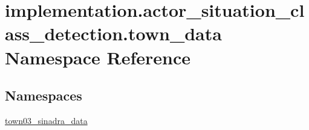 \hypertarget{namespaceimplementation_1_1actor__situation__class__detection_1_1town__data}{}\section{implementation.\+actor\+\_\+situation\+\_\+class\+\_\+detection.\+town\+\_\+data Namespace Reference}
\label{namespaceimplementation_1_1actor__situation__class__detection_1_1town__data}
\subsection*{Namespaces}
\begin{DoxyCompactItemize}
\item 
 \hyperlink{namespaceimplementation_1_1actor__situation__class__detection_1_1town__data_1_1town03__sinadra__data}{town03\+\_\+sinadra\+\_\+data}
\end{DoxyCompactItemize}
